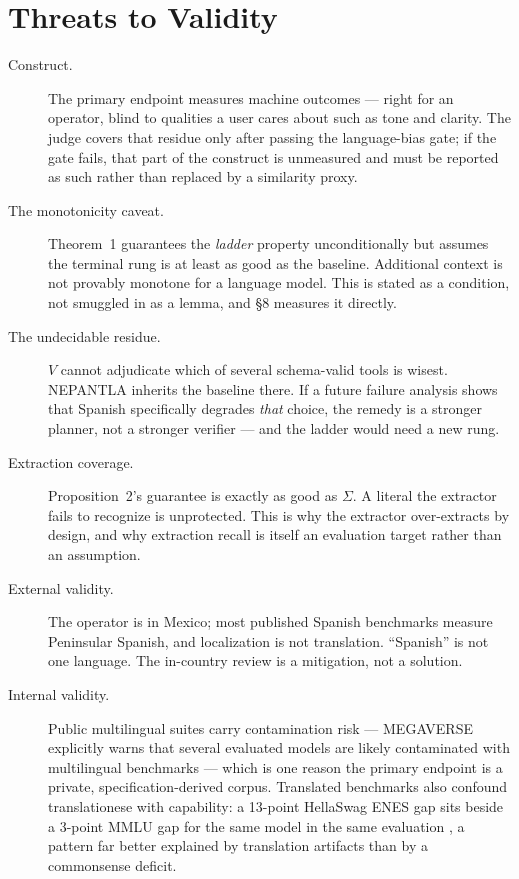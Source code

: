 \section{Threats to Validity}
\label{sec:threats-to-validity}

\begin{description}

\item[Construct.] The primary endpoint measures machine outcomes --- right for an
operator, blind to qualities a user cares about such as tone and clarity. The judge
covers that residue only after passing the language-bias gate; if the gate fails, that
part of the construct is unmeasured and must be reported as such rather than replaced
by a similarity proxy.

\item[The monotonicity caveat.] Theorem~1 guarantees the \emph{ladder} property
unconditionally but assumes the terminal rung is at least as good as the baseline.
Additional context is not provably monotone for a language model. This is stated as a
condition, not smuggled in as a lemma, and \S8 measures it directly.

\item[The undecidable residue.] $V$ cannot adjudicate which of several schema-valid
tools is wisest. NEPANTLA inherits the baseline there. If a future failure analysis
shows that Spanish specifically degrades \emph{that} choice, the remedy is a stronger
planner, not a stronger verifier --- and the ladder would need a new rung.

\item[Extraction coverage.] Proposition~2's guarantee is exactly as good as $\Sigma$. A
literal the extractor fails to recognize is unprotected. This is why the extractor
over-extracts by design, and why extraction recall is itself an evaluation target
rather than an assumption.

\item[External validity.] The operator is in Mexico; most published Spanish benchmarks
measure Peninsular Spanish, and localization is not translation. ``Spanish'' is not one
language. The in-country review is a mitigation, not a solution.

\item[Internal validity.] Public multilingual suites carry contamination risk ---
MEGAVERSE explicitly warns that several evaluated models are likely contaminated with
multilingual benchmarks \citep{ahuja2024megaverse} --- which is one reason the primary
endpoint is a private, specification-derived corpus. Translated benchmarks also confound
translationese with capability: a 13-point HellaSwag EN\textrightarrow{}ES gap sits
beside a 3-point MMLU gap for the same model in the same evaluation
\citep{thellmann2024european}, a pattern far better explained by translation artifacts
than by a commonsense deficit.


\end{description}

